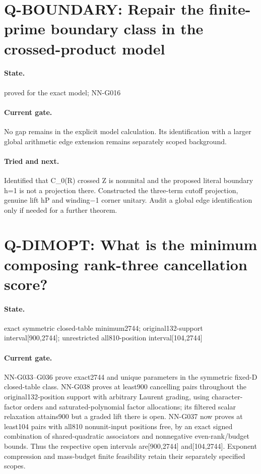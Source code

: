 \section{Q-BOUNDARY: Repair the finite-prime boundary class in the crossed-product model}
\paragraph{State.} proved for the exact model; NN-G016
\paragraph{Current gate.} No gap remains in the explicit model calculation. Its identification with a larger global arithmetic edge extension remains separately scoped background.
\paragraph{Tried and next.} Identified that C\_0(R) crossed Z is nonunital and the proposed literal boundary h=1 is not a projection there. Constructed the three-term cutoff projection, genuine lift hP and winding−1 corner unitary. Audit a global edge identification only if needed for a further theorem.

\section{Q-DIMOPT: What is the minimum composing rank-three cancellation score?}
\paragraph{State.} exact symmetric closed-table minimum2744; original132-support interval[900,2744]; unrestricted all810-position interval[104,2744]
\paragraph{Current gate.} NN-G033--G036 prove exact2744 and unique parameters in the symmetric fixed-D closed-table class. NN-G038 proves at least900 cancelling pairs throughout the original132-position support with arbitrary Laurent grading, using character-factor orders and saturated-polynomial factor allocations; its filtered scalar relaxation attains900 but a graded lift there is open. NN-G037 now proves at least104 pairs with all810 nonunit-input positions free, by an exact signed combination of shared-quadratic associators and nonnegative even-rank/budget bounds. Thus the respective open intervals are[900,2744] and[104,2744]. Exponent compression and mass-budget finite feasibility retain their separately specified scopes.
